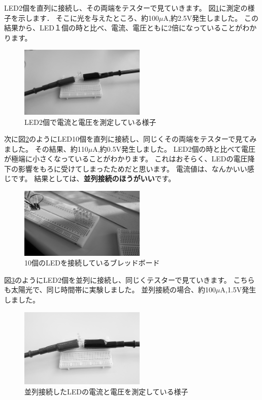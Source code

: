 LED2個を直列に接続し、その両端をテスターで見ていきます。
図\ref{fig:led2}に測定の様子を示します．
そこに光を与えたところ、約100$\mu\si\ampere$,約2.5$\si\volt$発生しました。
この結果から、LED１個の時と比べ、電流、電圧ともに2倍になっていることがわかります。

\begin{figure}[htbp]
    \centering
    \includegraphics[width=60mm]{./assets/mouse/gray/12.JPG}
    \caption{LED2個で電流と電圧を測定している様子}
    \label{fig:led2}
\end{figure}

次に図\ref{fig:led10}のようにLED10個を直列に接続し、同じくその両端をテスターで見てみました。
その結果、約110$\mu\si\ampere$,約0.5$\si\volt$発生しました。
LED2個の時と比べて電圧が極端に小さくなっていることがわかります。
これはおそらく、LEDの電圧降下の影響をもろに受けてしまったためだと思います。
電流値は、なんかいい感じです。
結果としては、\textbf{並列接続のほうがいい}です。


\begin{figure}[htbp]
    \centering
    \includegraphics[width=60mm]{./assets/mouse/gray/4.JPG}
    \caption{10個のLEDを接続しているブレッドボード}
    \label{fig:led10}
\end{figure}

図\ref{fig:led_par}のようにLED2個を並列に接続し、同じくテスターで見ていきます。
こちらも太陽光で、同じ時間帯に実験しました。
並列接続の場合、約100$\mu\si\ampere$,1.5$\si\volt$発生しました。


\begin{figure}[htbp]
    \centering
    \includegraphics[width=60mm]{./assets/mouse/gray/13.JPG}
    \caption{並列接続したLEDの電流と電圧を測定している様子}
    \label{fig:led_par}
\end{figure}


